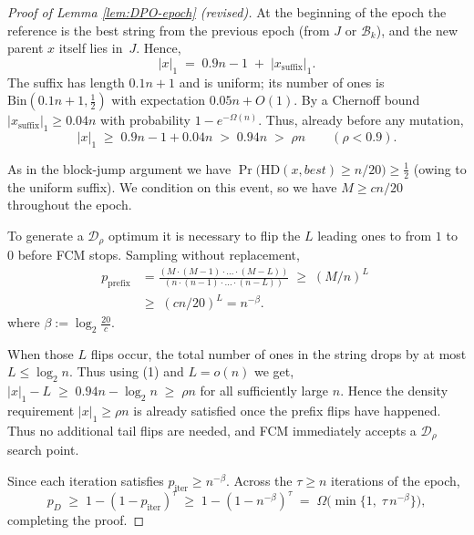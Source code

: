 \begin{proof}[Proof of Lemma \ref{lem:DPO-epoch} (revised)]
	At the beginning of the epoch the reference is the best string from the previous
	epoch (from $J$ or $\mathcal{B}_k$), and the new parent $x$ itself lies in~$J$.
	Hence,
	\[
	|x|_1\;=\;0.9n-1 \;+\; |x_{\text{suffix}}|_1.
	\]
	The suffix has length $0.1n+1$ and is uniform; its number of ones is
	$\mathrm{Bin}(0.1n+1,\tfrac12)$ with expectation $0.05n+O(1)$.
	By a Chernoff bound
	\(
	|x_{\text{suffix}}|_1\ge 0.04n
	\)
	with probability $1-e^{-\Omega(n)}$.
	Thus, already before any mutation,
	\[
	|x|_1
	\;\ge\;
	0.9n-1 + 0.04n
	\;>\;
	0.94n
	\;>\;
	\rho n
	\qquad(\rho<0.9).
	\tag{1}
	\]
	
	As in the block-jump argument we have
	\(
	\Pr\!\bigl(\mathrm{HD}(x,best)\ge n/20\bigr)\ge\tfrac12
	\)
	(owing to the uniform suffix). We condition on this event, so we have
	 \(M\ge cn/20\) throughout the epoch.
	
	To generate a $\mathcal{D}_\rho$ optimum it is necessary to flip the 
	\(L\) leading ones to from $1$ to $0$ before FCM stops.
	Sampling without replacement,
	\begin{align*}
		p_{\text{prefix}}
		&=\frac{(M \cdot (M-1)\cdot  ... \cdot (M-L))}{(n \cdot (n-1)\cdot  ... \cdot (n-L))}
		\;\ge\;
		(M/n)^{L}
		\;\\&\ge\;
		(cn/20)^{L}
		=n^{-\beta}.
	\end{align*}
	where $\beta:=\log_{2}\frac{20}{c}$.
	
	When those $L$ flips occur, the total number of  ones in the string drops by at most
	\( L\le\log_2 n\).
	Thus using (1) and \(L=o(n)\) we get,
	$|x|_1-L\;\ge\;0.94n-\log_2 n
	\;\ge\;\rho n$
	for all sufficiently large $n$.
	Hence the density requirement \(|x|_1\ge\rho n\) is already satisfied
	once the prefix flips have happened. Thus no additional tail flips are needed, and
	FCM immediately accepts a $\mathcal{D}_\rho$ search point.
	
	Since each iteration satisfies \(p_{\text{iter}}\ge n^{-\beta}\).
	Across the \(\tau\ge n\) iterations of the epoch,
	\[
	p_D
	\;\ge\;
	1-(1-p_{\text{iter}})^{\tau}
	\;\ge\;
	1-(1-n^{-\beta})^\tau 
	\;=\;
	\Omega\!\bigl(\min\{1,\;\tau\,n^{-\beta}\}\bigr),
	\]
	completing the proof.
\end{proof}

